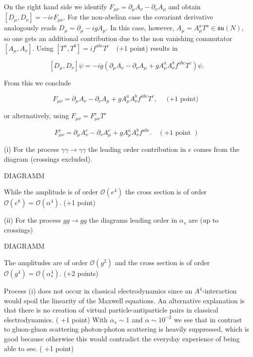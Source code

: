 \documentclass[10pt, letterpaper]{article}
\begin{document}
On the right hand side we identify $F_{\mu \nu}=\partial_\mu A_\nu-\partial_\nu A_\mu$ and obtain $\left[D_\mu, D_\nu\right]=-i e F_{\mu \nu}$. For the non-abelian case the covariant derivative analogously reads $D_\mu=\partial_\mu-i g A_\mu$. In this case, however, $A_\mu=A_\mu^a T^a \in \mathfrak{s u}(N)$, so one gets an additional contribution due to the non vanishing commutator $\left[A_\mu, A_\nu\right]$. Using $\left[T^a, T^b\right]=i f^{a b c} T^c \quad(+1$ point) results in

$$
\left[D_\mu, D_\nu\right] \psi=-i g\left(\partial_\mu A_\nu-\partial_\nu A_\mu+g A_\mu^a A_\nu^b f^{a b c} T^c\right) \psi .
$$


From this we conclude

$$
F_{\mu \nu}=\partial_\mu A_\nu-\partial_\nu A_\mu+g A_\mu^a A_\nu^b f^{a b c} T^c, \quad \text { (+1 point) }
$$

or alternatively, using $F_{\mu \nu}=F_{\mu \nu}^c T^c$

$$
F_{\mu \nu}^c=\partial_\mu A_\nu^c-\partial_\nu A_\mu^c+g A_\mu^a A_\nu^b f^{a b c} . \quad(+1 \text { point })
$$

(i) For the process $\gamma \gamma \rightarrow \gamma \gamma$ the leading order contribution in $e$ comes from the diagram (crossings excluded).

DIAGRAMM

While the amplitude is of order $\mathcal{O}\left(e^4\right)$ the cross section is of order $\mathcal{O}\left(e^8\right)=\mathcal{O}\left(\alpha^4\right)$. (+1 point)


(ii) For the process $g g \rightarrow g g$ the diagrams leading order in $\alpha_s$ are (up to crossings)

DIAGRAMM

The amplitudes are of order $\mathcal{O}\left(g^2\right)$ and the cross section is of order $\mathcal{O}\left(g^4\right)=\mathcal{O}\left(\alpha_s^4\right)$. (+2 points)

Process (i) does not occur in classical electrodynamics since an $A^4$-interaction would spoil the linearity of the Maxwell equations. An alternative explanation is that there is no creation of virtual particle-antiparticle pairs in classical electrodynamics. ( +1 point)
With $\alpha_s \sim 1$ and $\alpha \sim 10^{-2}$ we see that in contrast to gluon-gluon scattering photon-photon scattering is heavily suppressed, which is good because otherwise this would contradict the everyday experience of being able to see. ( +1 point)
\end{document}
